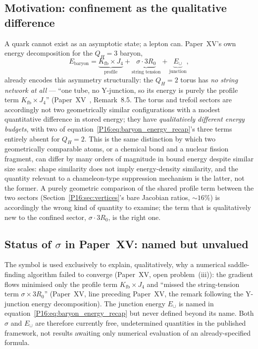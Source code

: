 \documentclass[11pt,a4paper]{article}
\theoremstyle{definition}\newtheorem{definition}[theorem]{Definition}
\theoremstyle{remark}
\theoremstyle{definition}\newtheorem{construction}[theorem]{Construction}
\newcommand{\Kfb}{K_{\mathrm{fb}}}
\newcommand{\QH}{Q_H}
\begin{document}
\subsection{Motivation: confinement as the qualitative difference}
\label{P16:sec:confinement_motivation}

A quark cannot exist as an asymptotic state; a lepton can. Paper~XV's
own energy decomposition for the $\QH=3$ baryon,
\begin{equation}
  E_{\mathrm{baryon}} = \underbrace{\Kfb\times J_4}_{\text{profile}}
  + \underbrace{\sigma\cdot 3R_0}_{\text{string tension}}
  + \underbrace{E_\cup}_{\text{junction}},
  \label{P16:eq:baryon_energy_recap}
\end{equation}
already encodes this asymmetry structurally: the $\QH=2$ torus has
\emph{no string network at all} --- ``one tube, no Y-junction, so its
energy is purely the profile term $\Kfb\times J_4$'' (Paper~XV~\cite{Paper15},
Remark~8.5. %
The torus and trefoil sectors are accordingly not two geometrically similar
configurations with a modest quantitative difference in stored energy; they
have \emph{qualitatively different energy budgets}, with two of
equation~\eqref{P16:eq:baryon_energy_recap}'s three terms entirely absent
for $\QH=2$. This is the same distinction by which two
geometrically comparable atoms, or a chemical bond and a nuclear
fission fragment, can differ by many orders of magnitude in bound
energy despite similar size scales: shape similarity does not imply
energy-density similarity, and the quantity relevant to a chameleon-type
suppression mechanism is the latter, not the former. A purely
geometric comparison of the shared profile term between the two
sectors (Section~\ref{P16:sec:vertices}'s bare Jacobian ratios, $\sim16\%$)
is accordingly the wrong kind of quantity to examine; the term that is
qualitatively new to the confined sector, $\sigma\cdot 3R_0$, is the
right one.

\subsection{Status of $\sigma$ in Paper~XV: named but unvalued}
\label{P16:sec:sigma_unvalued}

The symbol is used exclusively to explain, qualitatively, why
a numerical saddle-finding algorithm failed to converge (Paper~XV,
open problem~(iii)): the gradient flows minimised only the profile
term $\Kfb\times J_4$ and ``missed the string-tension term
$\sigma\times3R_0$'' (Paper~XV, line preceding
Paper~XV, the remark following the Y-junction energy decomposition). The junction energy $E_\cup$ is
named in equation~\eqref{P16:eq:baryon_energy_recap} but never defined
beyond its name. Both $\sigma$ and $E_\cup$ are therefore currently
free, undetermined quantities in the published framework, not
results awaiting only numerical evaluation of an already-specified
formula.
\end{document}
